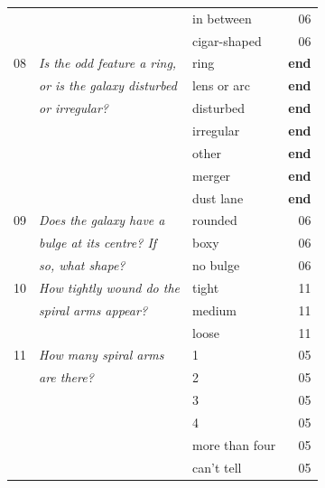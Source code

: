 \documentclass[usenatbib]{mn2e}
\begin{document}
\begin{table}
\begin{tabular}{@{}cllr}
      & {\it                               }  & in between       & 06 \\
      & {\it                               }  & cigar-shaped     & 06 \\
      \hline
08    & {\it Is the odd feature a ring,    }  & ring             & {\bf end}        \\
      & {\it or is the galaxy disturbed    }  & lens or arc      & {\bf end}        \\
      & {\it or irregular?                 }  & disturbed        & {\bf end}        \\
      & {\it                               }  & irregular        & {\bf end}        \\  
      & {\it                               }  & other            & {\bf end}        \\  
      & {\it                               }  & merger           & {\bf end}        \\  
      & {\it                               }  & dust lane        & {\bf end}        \\  
      \hline
09    & {\it Does the galaxy have a        }  & rounded          & 06 \\
      & {\it bulge at its centre? If       }  & boxy             & 06 \\
      & {\it so, what shape?               }  & no bulge         & 06 \\
      \hline
10    & {\it How tightly wound do the      }  & tight            & 11 \\
      & {\it spiral arms appear?           }  & medium           & 11 \\
      & {\it                               }  & loose            & 11 \\    
      \hline
11    & {\it How many spiral arms          }  & 1                & 05 \\
      & {\it  are there?                   }  & 2                & 05 \\
      & {\it                               }  & 3                & 05 \\
      & {\it                               }  & 4                & 05 \\
      & {\it                               }  & more than four   & 05 \\
      & {\it                               }  & can't tell       & 05 \\
\hline
 \end{tabular}
\end{table}
\end{document}
